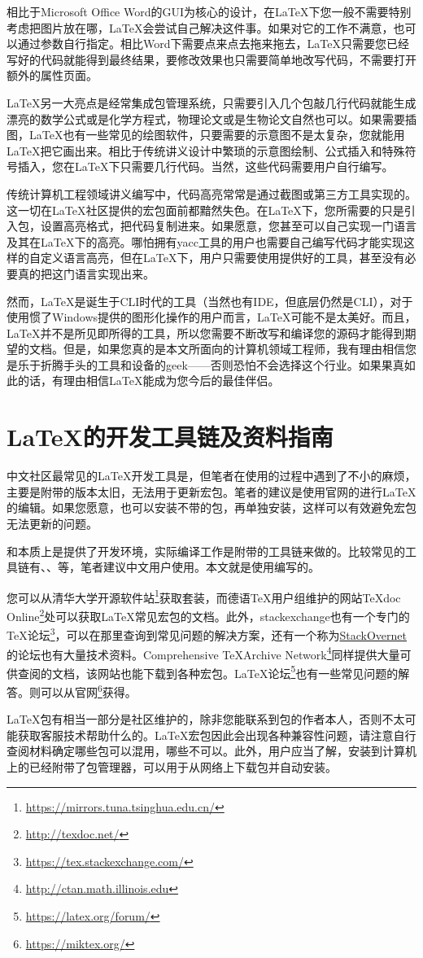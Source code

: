 相比于Microsoft Office Word的GUI为核心的设计，在\LaTeX 下您一般不需要特别考虑把图片放在哪，\LaTeX 会尝试自己解决这件事。如果对它的工作不满意，也可以通过参数自行指定。相比Word下需要点来点去拖来拖去，\LaTeX 只需要您已经写好的代码就能得到最终结果，要修改效果也只需要简单地改写代码，不需要打开额外的属性页面。

\LaTeX 另一大亮点是经常集成包管理系统，只需要引入几个包敲几行代码就能生成漂亮的数学公式或是化学方程式，物理论文或是生物论文自然也可以。如果需要插图，\LaTeX 也有一些常见的绘图软件，只要需要的示意图不是太复杂，您就能用\LaTeX 把它画出来。相比于传统讲义设计中繁琐的示意图绘制、公式插入和特殊符号插入，您在\LaTeX 下只需要几行代码。当然，这些代码需要用户自行编写。

传统计算机工程领域讲义编写中，代码高亮常常是通过截图或第三方工具实现的。这一切在\LaTeX 社区提供的宏包面前都黯然失色。在\LaTeX 下，您所需要的只是引入包，设置高亮格式，把代码复制进来。如果愿意，您甚至可以自己实现一门语言及其在\LaTeX 下的高亮。哪怕拥有yacc工具的用户也需要自己编写代码才能实现这样的自定义语言高亮，但在\LaTeX 下，用户只需要使用提供好的工具，甚至没有必要真的把这门语言实现出来。

然而，\LaTeX 是诞生于CLI时代的工具（当然也有IDE，但底层仍然是CLI），对于使用惯了Windows提供的图形化操作的用户而言，\LaTeX 可能不是太美好。而且，\LaTeX 并不是所见即所得的工具，所以您需要不断改写和编译您的源码才能得到期望的文档。但是，如果您真的是本文所面向的计算机领域工程师，我有理由相信您是乐于折腾手头的工具和设备的geek——否则恐怕不会选择这个行业。如果果真如此的话，有理由相信\LaTeX 能成为您今后的最佳伴侣。

\section{\LaTeX 的开发工具链及资料指南}

中文社区最常见的\LaTeX 开发工具是\CTeX，但笔者在使用\CTeX 的过程中遇到了不小的麻烦，主要是附带的\MiKTeX 版本太旧，无法用于更新宏包。笔者的建议是使用官网的\MiKTeX 进行\LaTeX 的编辑。如果您愿意，也可以安装不带\MiKTeX 的\CTeX 包，再单独安装\MiKTeX，这样可以有效避免宏包无法更新的问题。

\MiKTeX 和\CTeX 本质上是提供了开发环境，实际编译工作是附带的工具链来做的。比较常见的工具链有\pdfLaTeX、\XeLaTeX、\XeTeX 等，笔者建议中文用户使用\XeLaTeX。本文就是使用\XeLaTeX 编写的。

您可以从清华大学开源软件站\footnote{\url{https://mirrors.tuna.tsinghua.edu.cn/}}获取\CTeX 套装，而德语\TeX 用户组维护的网站\TeX doc Online\footnote{\url{http://texdoc.net/}}处可以获取\LaTeX 常见宏包的文档。此外，stackexchange也有一个专门的\TeX 论坛\footnote{\url{https://tex.stackexchange.com/}}，可以在那里查询到常见问题的解决方案，还有一个称为\href{https://stackovernet.com/}{StackOvernet}的论坛也有大量技术资料。Comprehensive \TeX\;Archive Network\footnote{\url{http://ctan.math.illinois.edu}}同样提供大量可供查阅的文档，该网站也能下载到各种宏包。\LaTeX 论坛\footnote{\url{https://latex.org/forum/}}也有一些常见问题的解答。\MiKTeX 则可以从\MiKTeX 官网\footnote{\url{https://miktex.org/}}获得。

\LaTeX 包有相当一部分是社区维护的，除非您能联系到包的作者本人，否则不太可能获取客服技术帮助什么的。\LaTeX 宏包因此会出现各种兼容性问题，请注意自行查阅材料确定哪些包可以混用，哪些不可以。此外，\MiKTeX 用户应当了解，安装到计算机上的\MiKTeX 已经附带了包管理器，可以用于从网络上下载包并自动安装。